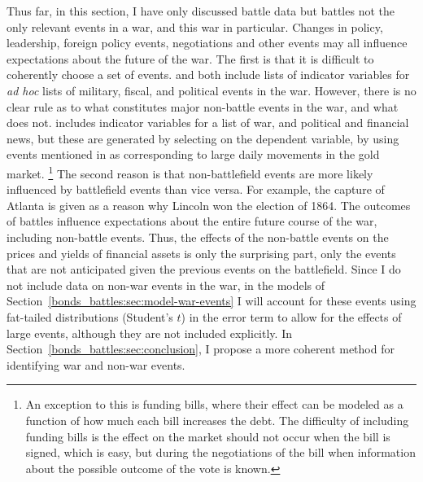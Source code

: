 Thus far, in this section, I have only discussed battle data but battles not the only relevant events in a war, and this war in particular.
Changes in policy, leadership, foreign policy events, negotiations and other events may all influence expectations about the future of the war.
The first is that it is difficult to coherently choose a set of events.
\textcite{McCandless1996} and \textcite{SmithSmith1997} both include lists of indicator variables for \textit{ad hoc} lists of military, fiscal, and political events in the war.
However, there is no clear rule as to what constitutes major non-battle events in the war, and what does not.
\textcite{SmithSmith1997} includes indicator variables for a list of war, and political and financial news, but these are generated by selecting on the dependent variable, by using events mentioned in \textcite{Mitchell1903} as corresponding to large daily movements in the gold market.%
\footnote{
  An exception to this is funding bills, where their effect can be modeled as a function of how much each bill increases the debt.
  The difficulty of including funding bills is the effect on the market should not occur when the bill is signed, which is easy, but during the negotiations of the bill when information about the possible outcome of the vote is known.
}
The second reason is that non-battlefield events are more likely influenced by battlefield events than vice versa.
For example, the capture of Atlanta is given as a reason why Lincoln won the election of 1864.
The outcomes of battles influence expectations about the entire future course of the war, including non-battle events.
Thus, the effects of the non-battle events on the prices and yields of financial assets is only the surprising part, only the events that are not anticipated given the previous events on the battlefield.
Since I do not include data on non-war events in the war, in the models of Section~\ref{bonds_battles:sec:model-war-events} I will account for these events using fat-tailed distributions (Student's $t$) in the error term to allow for the effects of large events, although they are not included explicitly.
In Section~\ref{bonds_battles:sec:conclusion}, I propose a more coherent method for identifying war and non-war events.

